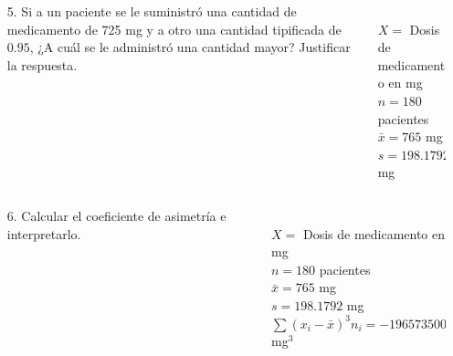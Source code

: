\documentclass[aspectratio=149,10pt,xcolor=dvipsnames,t]{beamer}
\begin{document}
\begin{frame}
\begin{columns}
\begin{column}[T]{0.65\textwidth}
\begin{enumerate}
\item[5.] Si a un paciente se le suministró una cantidad de medicamento de 725 mg y a otro una cantidad tipificada de
$0.95$, ¿A cuál se le administró una cantidad mayor? Justificar la respuesta. 
\end{enumerate}
\end{column}
\begin{column}[T]{0.35\textwidth}
\\
$X=$ Dosis de medicamento en mg\\
$n=180$ pacientes\\
$\bar x=765$ mg\\
$s=198.1792$ mg
\end{column}
\end{columns}
\end{frame}


\begin{frame}
\begin{columns}
\begin{column}[T]{0.65\textwidth}
\begin{enumerate}
\item[6.] Calcular el coeficiente de asimetría e interpretarlo. 
\end{enumerate}
\end{column}
\begin{column}[T]{0.35\textwidth}
\\
$X=$ Dosis de medicamento en mg\\
$n=180$ pacientes\\
$\bar x=765$ mg\\
$s=198.1792$ mg\\
$\sum (x_i-\bar x)^3n_i= -1965735000$ mg$^3$
\end{column}
\end{columns}
\end{frame}
\end{document}
